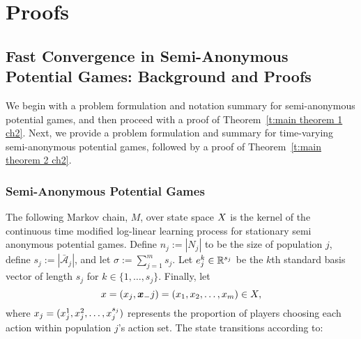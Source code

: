 \chapter{Proofs}

\section{Fast Convergence in Semi-Anonymous Potential Games: Background and Proofs}

We begin with a problem formulation and notation summary for semi-anonymous potential games, and then proceed with a proof of Theorem~\ref{t:main theorem 1 ch2}. Next, we provide a problem formulation and summary for time-varying semi-anonymous potential games, followed by a proof of Theorem~\ref{t:main theorem 2 ch2}.

\subsection{Semi-Anonymous Potential Games}\label{a:M defn}
The following Markov chain, $M$, over state space $X$ is the kernel of the continuous time modified log-linear learning process for stationary semi anonymous potential games.  Define $n_j := |N_j|$ to be the size of population $j$, define $s_j:= |\bar{\mathcal{A}}_j|$, and let $\sigma := \sum_{j = 1}^m s_j.$ Let $e_j^k \in \mathbb{R}^{s_j}$ be the $k$th standard basis vector of length $s_j$ for $k\in \{1,\ldots,s_j\}$.      Finally, let $$x = (x_j,{\boldsymbol{ x }}_-j) = (x_1,x_2,\ldots,x_m)\in X,$$
where $x_j = (x_j^1,x_j^2,\ldots,x_j^{s_j})$ represents the proportion of players choosing each action within population $j$'s action set.  The state transitions according to:
